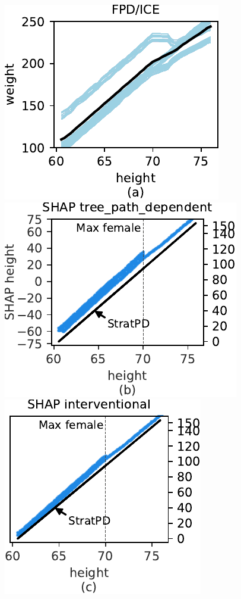 \documentclass[]{article} %
\begin{document}
\begin{figure}[!htbp]
\begin{center}
\includegraphics[scale=0.46]{images/height_vs_weight_pdp.pdf}~\includegraphics[scale=0.46]{images/weight_tree_path_dependent_shap.pdf}
\includegraphics[scale=0.46]{images/weight_interventional_shap.pdf}~

\end{center}
\end{figure}
\end{document}
